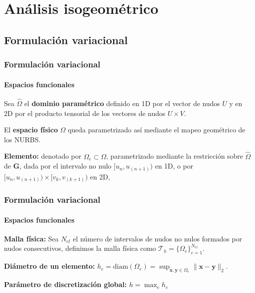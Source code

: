 \documentclass[compress]{beamer}
\begin{document}
\section{Análisis isogeométrico}
\subsection{Formulación variacional}
\begin{frame}

	\frametitle{Formulación variacional}
	\framesubtitle{Espacios funcionales}
	\begin{definition}    
    	Sea $\hat{\Omega}$ el \textbf{dominio paramétrico} definido en 1D por el vector de nudos $U$ y en 2D por el producto tensorial de los vectores de nudos $U \times V$.
	\end{definition}

	\begin{definition}   
		El \textbf{espacio físico} $\Omega$ queda parametrizado así mediante el mapeo geométrico de los NURBS.
	\end{definition}

	\begin{definition}
		\textbf{Elemento:} denotado por $\Omega_e\subset \Omega$, parametrizado mediante la restricción sobre $\hat{\Omega}$ de $\mathbf{G}$, dada por el intervalo no nulo $[u_n, u_{(n+1)})$ en 1D, o por $[u_n, u_{(n+1)})\times [v_k, v_{(k+1)})$ en 2D, 
	\end{definition}

\end{frame}

\begin{frame}
	\frametitle{Formulación variacional}
	\framesubtitle{Espacios funcionales}
	\begin{definition}
		\textbf{Malla física:} Sea $N_{el}$ el número de intervalos de nudos no nulos formados por nudos consecutivos, definimos la malla física como $\mathcal{T}_h = \{ \Omega_e \}_{e=1}^{N_{el}}$.
	\end{definition}

	\begin{definition}
		\textbf{Diámetro de un elemento:} $h_e = \text{diam}(\Omega_e) = \sup_{\mathbf{x}, \mathbf{y} \in \Omega_e} \| \mathbf{x} - \mathbf{y} \|_2$.
	\end{definition}

	\begin{definition}
		\textbf{Parámetro de discretización global:} $h = \max_{e} h_e$
	\end{definition}
\end{frame}
\end{document}
